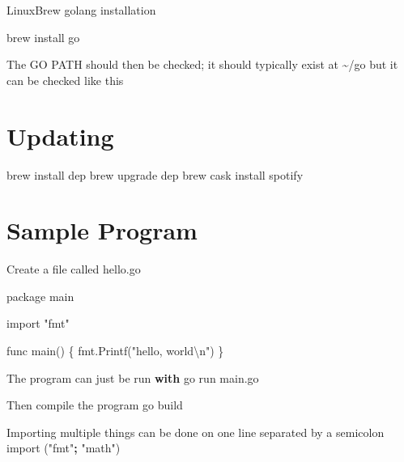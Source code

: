 \documentclass[]{book}
\newenvironment{Shaded}{\begin{snugshade}}{\end{snugshade}}
\newcommand{\CharTok}[1]{\textcolor[rgb]{0.31,0.60,0.02}{#1}}
\newcommand{\StringTok}[1]{\textcolor[rgb]{0.31,0.60,0.02}{#1}}
\newcommand{\ImportTok}[1]{#1}
\newcommand{\VariableTok}[1]{\textcolor[rgb]{0.00,0.00,0.00}{#1}}
\newcommand{\ControlFlowTok}[1]{\textcolor[rgb]{0.13,0.29,0.53}{\textbf{#1}}}
\newcommand{\OperatorTok}[1]{\textcolor[rgb]{0.81,0.36,0.00}{\textbf{#1}}}
\newcommand{\BuiltInTok}[1]{#1}
\newcommand{\ExtensionTok}[1]{#1}
\newcommand{\NormalTok}[1]{#1}
\begin{document}
LinuxBrew golang installation

\begin{Shaded}
\begin{Highlighting}[]
\ExtensionTok{brew}\NormalTok{ install go}
\end{Highlighting}
\end{Shaded}

The GO PATH should then be checked; it should typically exist at
\textasciitilde{}/go but it can be checked like this

\begin{Shaded}
\end{Shaded}

\section{Updating}\label{updating}

\begin{Shaded}
\begin{Highlighting}[]
\ExtensionTok{brew}\NormalTok{ install dep}
\ExtensionTok{brew}\NormalTok{ upgrade dep}
\ExtensionTok{brew}\NormalTok{ cask install spotify}
\end{Highlighting}
\end{Shaded}

\section{Sample Program}\label{sample-program}

Create a file called hello.go

\begin{Shaded}
\begin{Highlighting}[]
\NormalTok{package main}

\ImportTok{import} \StringTok{"fmt"}

\NormalTok{func main() \{}
\NormalTok{    fmt.Printf(}\StringTok{"hello, world}\CharTok{\textbackslash{}n}\StringTok{"}\NormalTok{)}
\NormalTok{\}}

\NormalTok{The program can just be run }\ControlFlowTok{with}
\NormalTok{go run main.go}

\NormalTok{Then }\BuiltInTok{compile}\NormalTok{ the program}
\NormalTok{    go build}

\NormalTok{Importing multiple things can be done on one line separated by a semicolon}
    \ImportTok{import}\NormalTok{ (}\StringTok{"fmt"}\OperatorTok{;} \StringTok{"math"}\NormalTok{)}
\end{Highlighting}
\end{Shaded}
\end{document}
